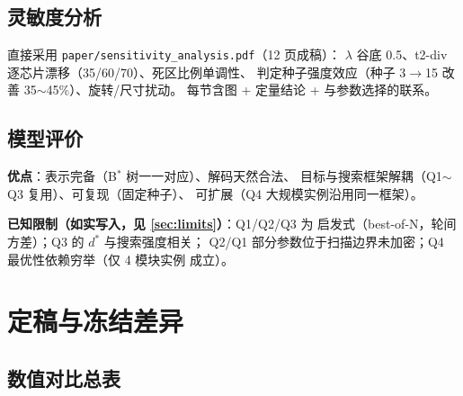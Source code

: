 \documentclass[12pt,a4paper]{article}
\begin{document}
\subsection{灵敏度分析}

直接采用 \texttt{paper/sensitivity\_analysis.pdf}（12 页成稿）：
$\lambda$ 谷底 0.5、t2-div 逐芯片漂移（35/60/70）、死区比例单调性、
判定种子强度效应（种子 3$\to$15 改善 35$\sim$45\%）、旋转/尺寸扰动。
每节含图 + 定量结论 + 与参数选择的联系。

\subsection{模型评价}

\textbf{优点}：表示完备（B$^*$ 树一一对应）、解码天然合法、
目标与搜索框架解耦（Q1$\sim$Q3 复用）、可复现（固定种子）、
可扩展（Q4 大规模实例沿用同一框架）。

\textbf{已知限制（如实写入，见 \ref{sec:limits}）}：Q1/Q2/Q3 为
启发式（best-of-N，轮间方差）；Q3 的 $d^*$ 与搜索强度相关；
Q2/Q1 部分参数位于扫描边界未加密；Q4 最优性依赖穷举（仅 4 模块实例
成立）。

\section{定稿与冻结差异}
\label{sec:diff}

\subsection{数值对比总表}
\end{document}
